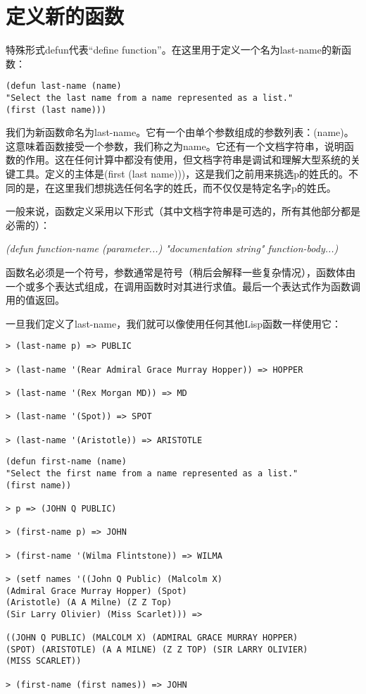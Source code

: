 \section{定义新的函数}
特殊形式defun代表“define function”。在这里用于定义一个名为last-name的新函数：
\begin{lstlisting}[frame=shadowbox]
(defun last-name (name)
"Select the last name from a name represented as a list."
(first (last name)))
\end{lstlisting}

我们为新函数命名为last-name。它有一个由单个参数组成的参数列表：(name)。这意味着函数接受一个参数，我们称之为name。它还有一个文档字符串，说明函数的作用。这在任何计算中都没有使用，但文档字符串是调试和理解大型系统的关键工具。定义的主体是(first (last name)))，这是我们之前用来挑选p的姓氏的。不同的是，在这里我们想挑选任何名字的姓氏，而不仅仅是特定名字p的姓氏。

一般来说，函数定义采用以下形式（其中文档字符串是可选的，所有其他部分都是必需的）：

\textsl{\emph{(defun function-name (parameter...)     "documentation string"     function-body...)}}

函数名必须是一个符号，参数通常是符号（稍后会解释一些复杂情况），函数体由一个或多个表达式组成，在调用函数时对其进行求值。最后一个表达式作为函数调用的值返回。

一旦我们定义了last-name，我们就可以像使用任何其他Lisp函数一样使用它：
\begin{lstlisting}[frame=shadowbox]
> (last-name p) => PUBLIC

> (last-name '(Rear Admiral Grace Murray Hopper)) => HOPPER

> (last-name '(Rex Morgan MD)) => MD

> (last-name '(Spot)) => SPOT

> (last-name '(Aristotle)) => ARISTOTLE
\end{lstlisting}

\begin{lstlisting}[frame=shadowbox]
(defun first-name (name)
"Select the first name from a name represented as a list."
(first name))

> p => (JOHN Q PUBLIC)

> (first-name p) => JOHN

> (first-name '(Wilma Flintstone)) => WILMA

> (setf names '((John Q Public) (Malcolm X)
(Admiral Grace Murray Hopper) (Spot)
(Aristotle) (A A Milne) (Z Z Top)
(Sir Larry Olivier) (Miss Scarlet))) =>

((JOHN Q PUBLIC) (MALCOLM X) (ADMIRAL GRACE MURRAY HOPPER)
(SPOT) (ARISTOTLE) (A A MILNE) (Z Z TOP) (SIR LARRY OLIVIER)
(MISS SCARLET))

> (first-name (first names)) => JOHN
\end{lstlisting}


